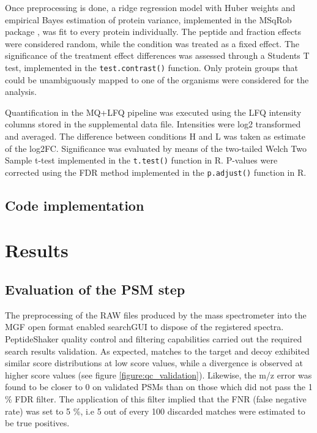 Once preprocessing is done, a ridge regression model with Huber weights and empirical Bayes estimation of protein variance, implemented in the MSqRob package \cite{Goeminne2016}, was fit to every protein individually. The peptide and fraction effects were considered random, while the condition was treated as a fixed effect. The significance of the treatment effect differences was assessed through a Student\textquotesingle s T test, implemented in the \texttt{test.contrast()} function. Only protein groups that could be unambiguously mapped to one of the organisms were considered for the analysis.

Quantification in the MQ+LFQ pipeline was executed using the LFQ intensity columns stored in the supplemental data file. Intensities were log2 transformed and averaged. The difference between conditions H and L was taken as estimate of the log2FC. Significance was evaluated by means of the two-tailed Welch Two Sample t-test implemented in the \texttt{t.test()} function in R. P-values were corrected using the FDR method implemented in the \texttt{p.adjust()} function in R.


\subsection{Code implementation}

\section{Results}

\subsection{Evaluation of the PSM step}

The preprocessing of the RAW files produced by the mass spectrometer into the MGF open format enabled searchGUI to dispose of the registered spectra. PeptideShaker quality control and filtering capabilities carried out the required search results validation. As expected, matches to the target and decoy exhibited similar score distributions at low score values, while a divergence is observed at higher score values (see figure \ref{figure:qc_validation}). Likewise, the m/z error was found to be closer to 0 on validated PSMs than on those which did not pass the 1 \% FDR filter. The application of this filter implied that the FNR (false negative rate) was set to 5 \%, i.e 5 out of every 100 discarded matches were estimated to be true positives.



